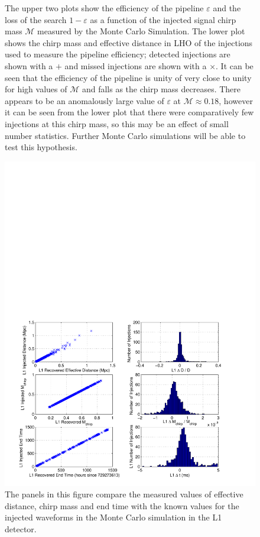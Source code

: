 \begin{figure}[p]
{\label{f:mchirp_eff}%
The upper two plots show the efficiency of the pipeline $\varepsilon$ and the
loss of the search $1-\varepsilon$ as a function of the injected signal chirp
mass $\mathcal{M}$ measured by the Monte Carlo Simulation. The lower plot
shows the chirp mass and effective distance in LHO of the injections used to
measure the pipeline efficiency; detected injections are shown with a $+$ and
missed injections are shown with a $\times$. It can be seen that the
efficiency of the pipeline is unity of very close to unity for high values of
$\mathcal{M}$ and falls as the chirp mass decreases. There appears to be an
anomalously large value of $\varepsilon$ at $\mathcal{M}\approx 0.18$, however
it can be seen from the lower plot that there were comparatively few
injections at this chirp mass, so this may be an effect of small number
statistics. Further Monte Carlo simulations will be able to test this
hypothesis.
}
\end{figure}

\begin{figure}[p]
\begin{center}
\includegraphics[width=\textwidth]{figures/result/l1_param_error}
\end{center}
\caption[Measurement accuracy of L1 Injection Parameters]{%
\label{f:l1_param_error}%
The panels in this figure compare the measured values of effective distance,
chirp mass and end time with the known values for the injected waveforms in
the Monte Carlo simulation in the L1 detector.
}
\end{figure}

